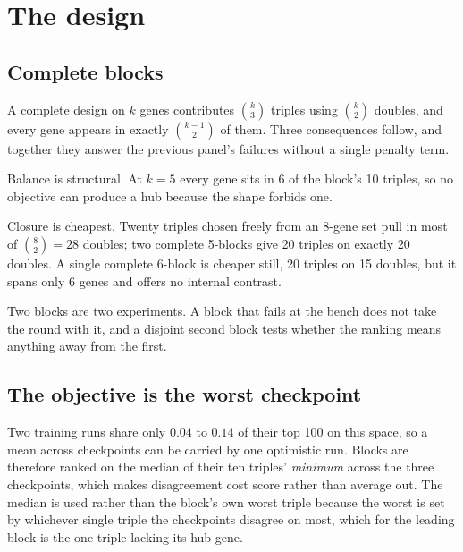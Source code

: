 \section{The design}

\subsection{Complete blocks}

A complete design on $k$ genes contributes $\binom{k}{3}$ triples using
$\binom{k}{2}$ doubles, and every gene appears in exactly $\binom{k-1}{2}$ of
them. Three consequences follow, and together they answer the previous panel's
failures without a single penalty term.

Balance is structural. At $k = 5$ every gene sits in 6 of the block's 10 triples,
so no objective can produce a hub because the shape forbids one.

Closure is cheapest. Twenty triples chosen freely from an 8-gene set pull in most
of $\binom{8}{2} = 28$ doubles; two complete 5-blocks give 20 triples on exactly
20 doubles. A single complete 6-block is cheaper still, 20 triples on 15 doubles,
but it spans only 6 genes and offers no internal contrast.

Two blocks are two experiments. A block that fails at the bench does not take the
round with it, and a disjoint second block tests whether the ranking means
anything away from the first.

\subsection{The objective is the worst checkpoint}

Two training runs share only $0.04$ to $0.14$ of their top 100 on this space, so
a mean across checkpoints can be carried by one optimistic run. Blocks are
therefore ranked on the median of their ten triples' \emph{minimum} across the
three checkpoints, which makes disagreement cost score rather than average out.
The median is used rather than the block's own worst triple because the worst is
set by whichever single triple the checkpoints disagree on most, which for the
leading block is the one triple lacking its hub gene.

